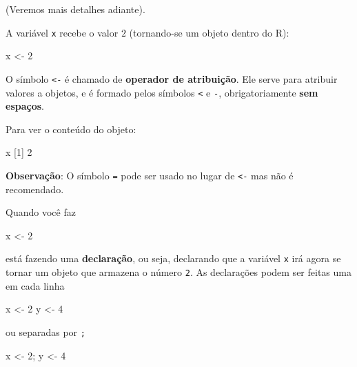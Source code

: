 \documentclass[10pt,a4paper]{book}
\newenvironment{Shaded}{\begin{snugshade}}{\end{snugshade}}
\newcommand{\DecValTok}[1]{\textcolor[rgb]{0.00,0.00,0.81}{#1}}
\newcommand{\StringTok}[1]{\textcolor[rgb]{0.31,0.60,0.02}{#1}}
\newcommand{\NormalTok}[1]{#1}
\begin{document}
(Veremos mais detalhes adiante).

A variável \texttt{x} recebe o valor \(2\) (tornando-se um objeto dentro
do R):

\begin{Shaded}
\begin{Highlighting}[]
\NormalTok{x <-}\StringTok{ }\DecValTok{2}
\end{Highlighting}
\end{Shaded}

O símbolo \texttt{\textless{}-} é chamado de \textbf{operador de
atribuição}. Ele serve para atribuir valores a objetos, e é formado
pelos símbolos \texttt{\textless{}} e \texttt{-}, obrigatoriamente
\textbf{sem espaços}.

Para ver o conteúdo do objeto:

\begin{Shaded}
\begin{Highlighting}[]
\NormalTok{x}
\NormalTok{[}\DecValTok{1}\NormalTok{] }\DecValTok{2}
\end{Highlighting}
\end{Shaded}

\textbf{Observação}: O símbolo \texttt{=} pode ser usado no lugar de
\texttt{\textless{}-} mas não é recomendado.

Quando você faz

\begin{Shaded}
\begin{Highlighting}[]
\NormalTok{x <-}\StringTok{ }\DecValTok{2}
\end{Highlighting}
\end{Shaded}

está fazendo uma \textbf{declaração}, ou seja, declarando que a variável
\texttt{x} irá agora se tornar um objeto que armazena o número
\texttt{2}. As declarações podem ser feitas uma em cada linha

\begin{Shaded}
\begin{Highlighting}[]
\NormalTok{x <-}\StringTok{ }\DecValTok{2}
\NormalTok{y <-}\StringTok{ }\DecValTok{4}
\end{Highlighting}
\end{Shaded}

ou separadas por \texttt{;}

\begin{Shaded}
\begin{Highlighting}[]
\NormalTok{x <-}\StringTok{ }\DecValTok{2}\NormalTok{; y <-}\StringTok{ }\DecValTok{4}
\end{Highlighting}
\end{Shaded}
\end{document}

